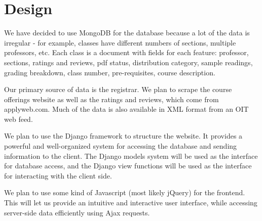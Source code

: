 \documentclass[11pt]{article}
\begin{document}
\section{Design}
\par We have decided to use MongoDB for the database because a lot of the data is irregular - for example, classes have different numbers of sections, multiple professors, etc. Each class is a document with fields for each feature: professor, sections, ratings and reviews, pdf status, distribution category, sample readings, grading breakdown, class number, pre-requisites, course description.
\par Our primary source of data is the registrar. We plan to scrape the course offerings website as well as the ratings and reviews, which come from applyweb.com. Much of the data is also available in XML format from an OIT web feed.
\par We plan to use the Django framework to structure the website. It provides a powerful and well-organized system for accessing the database and sending information to the client. The Django models system will be used as the interface for database access, and the Django view functions will be used as the interface for interacting with the client side.
\par We plan to use some kind of Javascript (most likely jQuery) for the frontend. This will let us provide an intuitive and interactive user interface, while accessing server-side data efficiently using Ajax requests.
\end{document}
